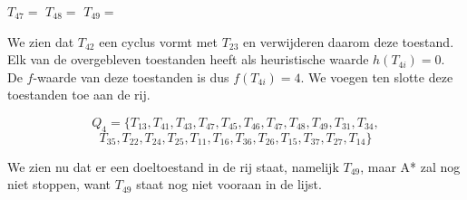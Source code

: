 \documentclass[alternative-exam.tex]{subfiles}
\begin{document}
\begin{center}
$T_{47} = $
$T_{48} = $
$T_{49} = $
\end{center}
We zien dat $T_{42}$ een cyclus vormt met $T_{23}$ en verwijderen daarom deze toestand. Elk van de overgebleven toestanden heeft als heuristische waarde $h(T_{4i}) = 0$. De $f$-waarde van deze toestanden is dus $f(T_{4i}) = 4$.
We voegen ten slotte deze toestanden toe aan de rij.
\begin{center}
\[
Q_4 = \{T_{13}, T_{41}, T_{43}, T_{47}, T_{45}, T_{46}, T_{47}, T_{48}, T_{49}, T_{31}, T_{34},
\]
\[
T_{35}, T_{22}, T_{24}, T_{25}, T_{11}, T_{16}, T_{36}, T_{26}, T_{15}, T_{37}, T_{27}, T_{14}\}
\]
\end{center}
We zien nu dat er een doeltoestand in de rij staat, namelijk $T_{49}$, maar A* zal nog niet stoppen, want $T_{49}$ staat nog niet vooraan in de lijst.
\end{document}
